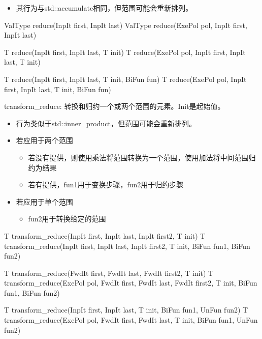 \begin{itemize}
\item
其行为与std::accumulate相同，但范围可能会重新排列。
\end{itemize}

\begin{cpp}
ValType reduce(InpIt first, InpIt last)
ValType reduce(ExePol pol, InpIt first, InpIt last)

T reduce(InpIt first, InpIt last, T init)
T reduce(ExePol pol, InpIt first, InpIt last, T init)

T reduce(InpIt first, InpIt last, T init, BiFun fun)
T reduce(ExePol pol, InpIt first, InpIt last, T init, BiFun fun)
\end{cpp}

transform\_reduce: 转换和归约一个或两个范围的元素。Init是起始值。

\begin{itemize}
\item
行为类似于std::inner\_product，但范围可能会重新排列。

\item
若应用于两个范围
\begin{itemize}
\item
若没有提供，则使用乘法将范围转换为一个范围，使用加法将中间范围归约为结果

\item
若有提供，fun1用于变换步骤，fun2用于归约步骤
\end{itemize}

\item
若应用于单个范围
\begin{itemize}
\item
fun2用于转换给定的范围
\end{itemize}
\end{itemize}

\begin{cpp}
T transform_reduce(InpIt first, InpIt last, InpIt first2, T init)
T transform_reduce(InpIt first, InpIt last,
				   InpIt first2, T init, BiFun fun1, BiFun fun2)

T transform_reduce(FwdIt first, FwdIt last, FwdIt first2, T init)
T transform_reduce(ExePol pol, FwdIt first, FwdIt last,
				   FwdIt first2, T init, BiFun fun1, BiFun fun2)

T transform_reduce(InpIt first, InpIt last, T init, BiFun fun1, UnFun fun2)
T transform_reduce(ExePol pol, FwdIt first, FwdIt last,
				   T init, BiFun fun1, UnFun fun2)
\end{cpp}

